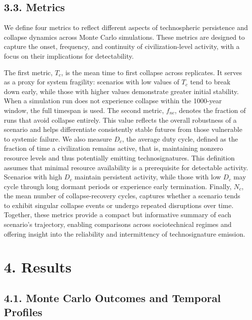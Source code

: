 \subsection{3.3. Metrics}\label{metrics}

We define four metrics to reflect different aspects of technospheric persistence and collapse dynamics across Monte Carlo simulations. These metrics are designed to capture the onset, frequency, and continuity of civilization-level activity, with a focus on their implications for detectability.

The first metric, \(T_{c}\), is the mean time to first collapse across replicates. It serves as a proxy for system fragility: scenarios with low values of \(T_{c}\) tend to break down early, while those with higher values demonstrate greater initial stability. When a simulation run does not experience collapse within the 1000-year window, the full timespan is used. The second metric, \(f_{nc}\), denotes the fraction of runs that avoid collapse entirely. This value reflects the overall robustness of a scenario and helps differentiate consistently stable futures from those vulnerable to systemic failure. We also measure \(D_{c}\), the average duty cycle, defined as the fraction of time a civilization remains active, that is, maintaining nonzero resource levels and thus potentially emitting technosignatures. This definition assumes that minimal resource availability is a prerequisite for detectable activity. Scenarios with high \(D_{c}\) maintain persistent activity, while those with low \(D_{c}\) may cycle through long dormant periods or experience early termination. Finally, \(N_{c}\), the mean number of collapse-recovery cycles, captures whether a scenario tends to exhibit singular collapse events or undergo repeated disruptions over time. Together, these metrics provide a compact but informative summary of each scenario's trajectory, enabling comparisons across sociotechnical regimes and offering insight into the reliability and intermittency of technosignature emission.

\section{4. Results}\label{results}

\subsection{4.1. Monte Carlo Outcomes and Temporal Profiles}\label{monte-carlo-outcomes-and-temporal-profiles}

